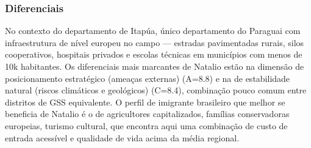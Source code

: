 \subsubsection*{Diferenciais}\label{dif-natalio-0710}
No contexto do departamento de Itapúa, único departamento do Paraguai com infraestrutura de nível europeu no campo — estradas pavimentadas rurais, silos cooperativos, hospitais privados e escolas técnicas em municípios com menos de 10k habitantes. Os diferenciais mais marcantes de Natalio estão na dimensão de posicionamento estratégico (ameaças externas) (A=8.8) e na de estabilidade natural (riscos climáticos e geológicos) (C=8.4), combinação pouco comum entre distritos de GSS equivalente. O perfil de imigrante brasileiro que melhor se beneficia de Natalio é o de agricultores capitalizados, famílias conservadoras europeias, turismo cultural, que encontra aqui uma combinação de custo de entrada acessível e qualidade de vida acima da média regional.
